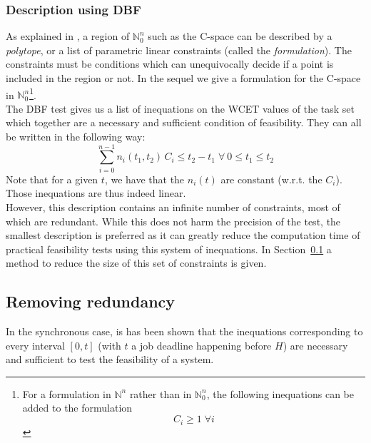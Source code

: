 \documentclass[times, 10pt,twocolumn, a4paper]{article}
\begin{document}

		\subsubsection{Description using DBF}
			\label{sct:cspaceDescr}

			As explained in \cite{nemhauser1988integer}, a region of $\mathbb{N}_0^n$ such as the C-space can be described by a \emph{polytope}, or a list of parametric linear constraints (called the \emph{formulation}). The constraints must be conditions which can unequivocally decide if a point is included in the region or not. In the sequel we give a formulation for the C-space in $\mathbb{N}_0^n$\footnote{For a formulation in $\mathbb{N}^n$ rather than in $\mathbb{N}_0^n$, the following inequations can be added to the formulation \[ C_i \geqslant 1 \; \forall i \]}.\\

			The DBF test gives us a list of inequations on the WCET values of the task set which together are a necessary and sufficient condition of feasibility. They can all be written in the following way:
			\[
				\sum_{i=0}^{n-1} n_i(t_1, t_2) \, C_i \leq t_2 - t_1 \; \forall \: 0 \leq t_1 \leq t_2
			\]
			Note that for a given $t$, we have that the $n_i(t)$ are
			constant (w.r.t. the $C_i$). Those inequations are thus indeed linear.\\

			However, this description contains an infinite number of constraints, most of
			which are redundant. While this does not harm the precision of the
			test, the smallest description is preferred as it can greatly
			reduce the computation time of practical feasibility tests using this system
			of inequations. In Section~\ref{sct:removeRedundancy} a method to reduce the size of this set of constraints is given.

	\subsection{Removing redundancy}
		\label{sct:removeRedundancy}

	In the synchronous case, is has been shown that the inequations corresponding
	to every interval $[0, t]$ (with $t$ a job deadline happening before $H$) are
	necessary and sufficient to test the feasibility of a system.\\
\end{document}
